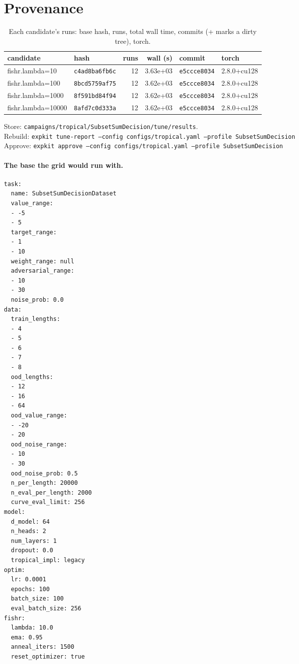 \documentclass[10pt]{article}
\begin{document}
\section{Provenance}
{\small
\begin{longtable}{llrrll}
\caption{Each candidate's runs: base hash, runs, total wall time, commits (+ marks a dirty tree), torch.}\label{tab:provenance}\\
\toprule
candidate & hash & runs & wall (s) & commit & torch\\
\midrule
\endhead
fishr.lambda=10 & \texttt{c4ad8ba6fb6c} & 12 & 3.63e+03 & \texttt{e5ccce8034} & 2.8.0+cu128\\
fishr.lambda=100 & \texttt{8bcd5759af75} & 12 & 3.62e+03 & \texttt{e5ccce8034} & 2.8.0+cu128\\
fishr.lambda=1000 & \texttt{8f591bd84f94} & 12 & 3.62e+03 & \texttt{e5ccce8034} & 2.8.0+cu128\\
fishr.lambda=10000 & \texttt{8afd7c0d333a} & 12 & 3.62e+03 & \texttt{e5ccce8034} & 2.8.0+cu128\\
\bottomrule
\end{longtable}
}
\noindent Store: \texttt{campaigns/tropical/SubsetSumDecision/tune/results}.\\
Rebuild: \texttt{expkit tune-report --config configs/tropical.yaml --profile SubsetSumDecision}\\
Approve: \texttt{expkit approve --config configs/tropical.yaml --profile SubsetSumDecision}

\paragraph{The base the grid would run with.}
{\footnotesize
\begin{verbatim}
task:
  name: SubsetSumDecisionDataset
  value_range:
  - -5
  - 5
  target_range:
  - 1
  - 10
  weight_range: null
  adversarial_range:
  - 10
  - 30
  noise_prob: 0.0
data:
  train_lengths:
  - 4
  - 5
  - 6
  - 7
  - 8
  ood_lengths:
  - 12
  - 16
  - 64
  ood_value_range:
  - -20
  - 20
  ood_noise_range:
  - 10
  - 30
  ood_noise_prob: 0.5
  n_per_length: 20000
  n_eval_per_length: 2000
  curve_eval_limit: 256
model:
  d_model: 64
  n_heads: 2
  num_layers: 1
  dropout: 0.0
  tropical_impl: legacy
optim:
  lr: 0.0001
  epochs: 100
  batch_size: 100
  eval_batch_size: 256
fishr:
  lambda: 10.0
  ema: 0.95
  anneal_iters: 1500
  reset_optimizer: true
\end{verbatim}
}

\clearpage
\appendix
\end{document}
